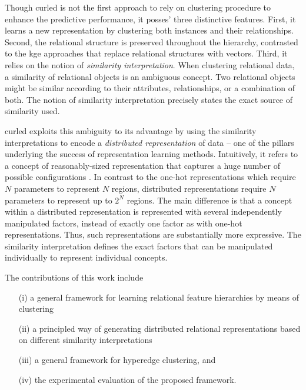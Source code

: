 Though \gls{curled} is not the first approach to rely on clustering procedure to enhance the predictive performance, it posses' three distinctive features.
First, it learns a new representation by clustering both instances and their relationships.
Second, the relational structure is  preserved throughout the hierarchy, contrasted to the \gls{kge} approaches that replace relational structures with vectors.
Third, it relies on the notion of \textit{similarity interpretation}.
When clustering relational data, a similarity of relational objects is an ambiguous concept.
Two relational objects might be similar according to their attributes, relationships, or a combination of both.
The notion of similarity interpretation precisely states the exact source of similarity used.



\gls{curled} exploits this ambiguity to its advantage by using the similarity interpretations to encode a \textit{distributed representation} of data -- one of the pillars underlying the success of representation learning methods.
Intuitively, it refers to a concept of  reasonably-sized representation that captures a huge number of possible configurations \cite{Bengio2013RLR}.
In contrast to the one-hot representations which require $N$ parameters to represent $N$ regions,  distributed representations require $N$ parameters to represent up to $2^N$ regions.
The main difference is that a concept within a distributed representation is represented with several independently manipulated factors, instead of exactly one factor as with one-hot representations.
Thus, such representations are substantially more expressive. 
The similarity interpretation defines the exact factors that can be manipulated individually to represent individual concepts.



The contributions of this work include
\begin{itemize}
	\item[(i)] a general framework for learning relational feature hierarchies by means of clustering
	\item[(ii)] a principled way of generating distributed relational representations based on different similarity interpretations
	\item[(iii)] a general framework for hyperedge clustering, and 
	\item[(iv)] the experimental evaluation of the proposed framework.
\end{itemize}



